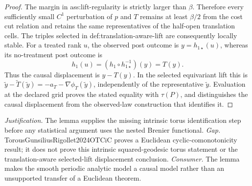 \documentclass{article}
\begin{document}
\begin{proof}
The margin in ass:lift-regularity is strictly larger than \(\beta\).  Therefore every sufficiently small \(C^1\) perturbation of \(p\) and \(T\) remains at least \(\beta/2\) from the cost cut relation and retains the same representatives of the half-open translation cells.  The triples selected in def:translation-aware-lift are consequently locally stable.  For a treated rank \(u\), the observed post outcome is \(y=h_{1\star}(u)\), whereas its no-treatment post outcome is
\[
h_1(u)=(h_1\circ h_{1\star}^{-1})(y)=T(y).
\]
Thus the causal displacement is \(y-T(y)\).  In the selected equivariant lift this is
\(\widetilde y-\widetilde T(\widetilde y)=-a_T-\nabla\phi_T(\widetilde y)\), independently of the representative \(\widetilde y\).  Evaluation at the declared grid proves the stated equality with \(\tau(P)\), and distinguishes the causal displacement from the observed-law construction that identifies it.
\end{proof}
\par\smallskip\noindent \textit{Justification.} The lemma supplies the missing intrinsic torus identification step before any statistical argument uses the nested Brenier functional. \textit{Gap.} TorousGunsiliusRigollet2024OTCiC proves a Euclidean cyclic-comonotonicity result; it does not prove this intrinsic squared-geodesic torus statement or the translation-aware selected-lift displacement conclusion. \textit{Consumer.} The lemma makes the smooth periodic analytic model a causal model rather than an unsupported transfer of a Euclidean theorem.
\end{document}
